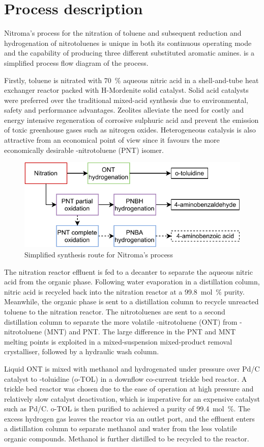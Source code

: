 \section*{Process description}

Nitroma's process for the nitration of toluene and subsequent reduction and hydrogenation of nitrotoluenes is unique in both its continuous operating mode and the capability of producing three different substituted aromatic amines.   is a simplified process flow diagram of the process.

Firstly, toluene is nitrated with \SI{70}{\percent} aqueous nitric acid in a shell-and-tube heat exchanger reactor packed with H-Mordenite solid catalyst. Solid acid catalysts were preferred over the traditional mixed-acid synthesis due to environmental, safety and performance advantages. Zeolites alleviate the need for costly and energy intensive regeneration of corrosive sulphuric acid and prevent the emission of toxic greenhouse gases such as nitrogen oxides. Heterogeneous catalysis is also attractive from an economical point of view since it favours the more economically desirable \para-nitrotoluene (PNT) isomer. 

\begin{figure}
    \centering
    \includegraphics[width=0.4\linewidth]{chapters/0-executive-summary/figures/BFD_nitroma-simplifed.pdf}
    \caption{Simplified synthesis route for Nitroma's process}
    \label{fig:BFD-ES}
\end{figure}
The nitration reactor effluent is fed to a decanter to separate the aqueous nitric acid from the organic phase. Following water evaporation in a distillation column, nitric acid is recycled back into the nitration reactor at a \SI{99.8}{mol\percent} purity. Meanwhile, the organic phase is sent to a distillation column to recycle unreacted toluene to the nitration reactor. The nitrotoluenes are sent to a second distillation column to separate the more volatile \ortho-nitrotoluene (ONT) from \meta-nitrotoluene (MNT) and PNT. The large difference in the PNT and MNT melting points is exploited in a mixed-suspension mixed-product removal crystalliser, followed by a hydraulic wash column.

Liquid ONT is mixed with methanol and hydrogenated under pressure over Pd/C catalyst to \ortho-toluidine (o-TOL) in a downflow co-current trickle bed reactor. A trickle bed reactor was chosen due to the ease of operation at high pressure and relatively slow catalyst deactivation, which is imperative for an expensive catalyst such as Pd/C. o-TOL is then purified to achieved a purity of \SI{99.4}{mol\percent}. The excess hydrogen gas leaves the reactor via an outlet port, and the effluent enters a distillation column to separate methanol and water from the less volatile organic compounds. Methanol is further distilled to be recycled to the reactor. 


